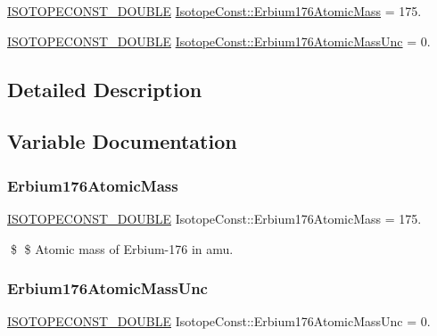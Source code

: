 \begin{DoxyCompactItemize}
\item 
\mbox{\hyperlink{group___isotope_const-_macros_ga8f45a7272ce02c0b4c65c44636ed719a}{I\+S\+O\+T\+O\+P\+E\+C\+O\+N\+S\+T\+\_\+\+D\+O\+U\+B\+LE}} \mbox{\hyperlink{group___isotope_const-_erbium-_er176_ga7af8f849dddb8d3b3d6da8321097f20d}{Isotope\+Const\+::\+Erbium176\+Atomic\+Mass}} = 175.
\item 
\mbox{\hyperlink{group___isotope_const-_macros_ga8f45a7272ce02c0b4c65c44636ed719a}{I\+S\+O\+T\+O\+P\+E\+C\+O\+N\+S\+T\+\_\+\+D\+O\+U\+B\+LE}} \mbox{\hyperlink{group___isotope_const-_erbium-_er176_ga0f5cec4d4a0ea12f9ec0849ae510d1da}{Isotope\+Const\+::\+Erbium176\+Atomic\+Mass\+Unc}} = 0.
\end{DoxyCompactItemize}


\subsection{Detailed Description}


\subsection{Variable Documentation}
\mbox{\label{group___isotope_const-_erbium-_er176_ga7af8f849dddb8d3b3d6da8321097f20d}} 
\subsubsection{\texorpdfstring{Erbium176\+Atomic\+Mass}{Erbium176AtomicMass}}
{\footnotesize\ttfamily \mbox{\hyperlink{group___isotope_const-_macros_ga8f45a7272ce02c0b4c65c44636ed719a}{I\+S\+O\+T\+O\+P\+E\+C\+O\+N\+S\+T\+\_\+\+D\+O\+U\+B\+LE}} Isotope\+Const\+::\+Erbium176\+Atomic\+Mass = 175.}

\$ \$ Atomic mass of Erbium-\/176 in amu. \mbox{\label{group___isotope_const-_erbium-_er176_ga0f5cec4d4a0ea12f9ec0849ae510d1da}} 
\subsubsection{\texorpdfstring{Erbium176\+Atomic\+Mass\+Unc}{Erbium176AtomicMassUnc}}
{\footnotesize\ttfamily \mbox{\hyperlink{group___isotope_const-_macros_ga8f45a7272ce02c0b4c65c44636ed719a}{I\+S\+O\+T\+O\+P\+E\+C\+O\+N\+S\+T\+\_\+\+D\+O\+U\+B\+LE}} Isotope\+Const\+::\+Erbium176\+Atomic\+Mass\+Unc = 0.}

